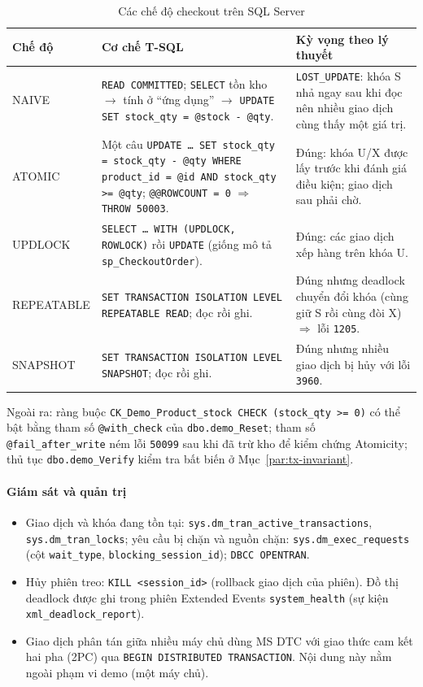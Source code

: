 \begin{table}[htbp]
\centering
\caption{Các chế độ checkout trên SQL Server}
\label{tab:tx-mssql-modes}
\renewcommand{\arraystretch}{1.25}
\begin{tabularx}{\textwidth}{>{\ttfamily}l X X}
\toprule
\normalfont\textbf{Chế độ} & \textbf{Cơ chế T-SQL} & \textbf{Kỳ vọng theo lý thuyết} \\
\midrule
NAIVE & \texttt{READ COMMITTED}; \texttt{SELECT} tồn kho $\rightarrow$ tính ở ``ứng dụng'' $\rightarrow$ \texttt{UPDATE SET stock\_qty = @stock - @qty}. & \texttt{LOST\_UPDATE}: khóa S nhả ngay sau khi đọc nên nhiều giao dịch cùng thấy một giá trị. \\
ATOMIC & Một câu \texttt{UPDATE \ldots{} SET stock\_qty = stock\_qty - @qty WHERE product\_id = @id AND stock\_qty >= @qty}; \texttt{@@ROWCOUNT = 0} $\Rightarrow$ \texttt{THROW 50003}. & Đúng: khóa U/X được lấy trước khi đánh giá điều kiện; giao dịch sau phải chờ. \\
UPDLOCK & \texttt{SELECT \ldots{} WITH (UPDLOCK, ROWLOCK)} rồi \texttt{UPDATE} (giống mô tả \texttt{sp\_CheckoutOrder}). & Đúng: các giao dịch xếp hàng trên khóa U. \\
REPEATABLE & \texttt{SET TRANSACTION ISOLATION LEVEL REPEATABLE READ}; đọc rồi ghi. & Đúng nhưng deadlock chuyển đổi khóa (cùng giữ S rồi cùng đòi X) $\Rightarrow$ lỗi \texttt{1205}. \\
SNAPSHOT & \texttt{SET TRANSACTION ISOLATION LEVEL SNAPSHOT}; đọc rồi ghi. & Đúng nhưng nhiều giao dịch bị hủy với lỗi \texttt{3960}. \\
\bottomrule
\end{tabularx}
\end{table}

Ngoài ra: ràng buộc \texttt{CK\_Demo\_Product\_stock CHECK (stock\_qty >= 0)} có thể bật bằng tham số \texttt{@with\_check} của \texttt{dbo.demo\_Reset}; tham số \texttt{@fail\_after\_write} ném lỗi \texttt{50099} sau khi đã trừ kho để kiểm chứng Atomicity; thủ tục \texttt{dbo.demo\_Verify} kiểm tra bất biến ở Mục~\ref{par:tx-invariant}.

\paragraph{Giám sát và quản trị}\mbox{}

\begin{itemize}
    \item Giao dịch và khóa đang tồn tại: \texttt{sys.dm\_tran\_active\_transactions}, \texttt{sys.dm\_tran\_locks}; yêu cầu bị chặn và nguồn chặn: \texttt{sys.dm\_exec\_requests} (cột \texttt{wait\_type}, \texttt{blocking\_session\_id}); \texttt{DBCC OPENTRAN}.
    \item Hủy phiên treo: \texttt{KILL <session\_id>} (rollback giao dịch của phiên). Đồ thị deadlock được ghi trong phiên Extended Events \texttt{system\_health} (sự kiện \texttt{xml\_deadlock\_report}).
    \item Giao dịch phân tán giữa nhiều máy chủ dùng MS DTC với giao thức cam kết hai pha (2PC) qua \texttt{BEGIN DISTRIBUTED TRANSACTION}. Nội dung này nằm ngoài phạm vi demo (một máy chủ).
\end{itemize}

